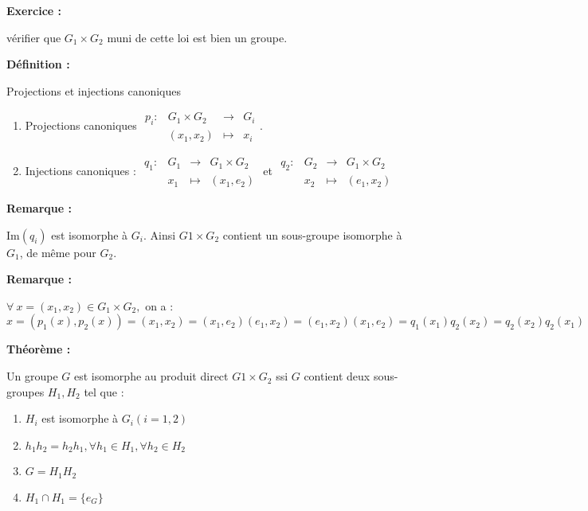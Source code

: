 \documentclass{report}
\newenvironment{definition}[1][]{
    \begin{tcolorbox}[colframe= white]
    \textbf{Définition :} 
    #1 \par
    }
    {\end{tcolorbox}}
\newenvironment{exo}{\begin{tcolorbox}[colframe= white]
    \textbf{Exercice :}
    \par}
    {\end{tcolorbox}}
\newenvironment{theoreme}[1][]{
    \begin{tcolorbox}[]
    \textbf{Théorème :} #1  \par} 
    {\end{tcolorbox}}
\newcommand{\remarque}{
    \noindent\textbf{Remarque :} \par
}
\newcommand{\im}[0]{\textrm{Im}}
\newcommand{\fonction}[5]{
    \begin{array}{l|rcl}
    #1: & #2 & \longrightarrow & #3 \\
        & #4 & \longmapsto & #5 
    \end{array}
}
\begin{document}
\begin{exo}
    vérifier que $G_1 \times G_2$ muni de cette loi est bien un groupe.
\end{exo}
\begin{definition}{Projections et injections canoniques}
\begin{enumerate}
    \item Projections canoniques $\fonction{p_i}{G_1 \times G_2}{G_i}{(x_1 ,x_2)}{x_i}$.
    \item Injections canoniques : $\fonction{q_1}{G_1}{G_1 \times G_2}{x_1}{(x_1 ,e_2)}$ et $\fonction{q_2}{G_2}{G_1 \times G_2}{x_2}{(e_1 ,x_2)}$
\end{enumerate}
\end{definition}

\remarque{$\im (q_i)$ est isomorphe à $G_i$. Ainsi $G1 \times G_2$ contient un sous-groupe isomorphe à $G_1$, de même pour $G_2$.}
    


\remarque{$\forall ~x = (x_1 ,x_2) \in G_1 \times G_2,$ on a :\\
    $x = (p_1 (x), p_2 (x)) = (x_1 ,x_2) = (x_1 ,e_2)(e_1 ,x_2) = (e_1 ,x_2)(x_1 ,e_2) = q_1 (x_1)q_2 (x_2) = q_2(x_2)q_2(x_1)$\\}
    

\begin{theoreme}
    Un groupe $G$ est isomorphe au produit direct $G1 \times G_2$ ssi $G$ contient deux sous-groupes $H_1,H_2$ tel que :
    \begin{enumerate}
        \item $H_i$ est isomorphe à $G_i (i = 1,2)$
        \item $h_1 h_2 = h_2 h_1, \forall h_1\in H_1, \forall h_2\in H_2$
        \item $G = H_1 H_2$
        \item $H_1 \cap H_1 = \{e_G\}$
    \end{enumerate}
\end{theoreme}
\end{document}
